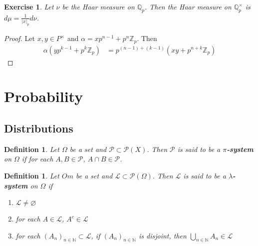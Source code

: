 \documentclass[12pt]{amsart}
\newtheorem{defn}[thm]{Definition}
\newtheorem{ex}[thm]{Exercise}
\newcommand{\al}{\alpha}
\newcommand{\lam}{\lambda}
\newcommand{\Om}{\Omega}
\newcommand{\N}{\mathbb{N}}
\newcommand{\Z}{\mathbb{Z}}
\newcommand{\Q}{\mathbb{Q}}
\newcommand{\ML}{\mathcal{L}}
\newcommand{\MP}{\mathcal{P}}
\begin{document}
	\begin{ex}
		Let $\nu$ be the Haar measure on $\Q_p$. Then the Haar measure on $\Q_p^{\times}$  is $d \mu = \frac{1}{|x|_p}d \nu$.
	\end{ex}

	\begin{proof}
		Let $x, y \in P^{\times}$ and $\al = xp^{n-1} + p^n\Z_p$. Then 
		\begin{align*}
			\al (yp^{k-1} + p^k \Z_p) 
			& = p^{(n-1)+ (k-1)}(xy + p^{n+k} \Z_p) 
		\end{align*}
	\end{proof}
	
	
	
	\newpage
	
	
	
	
	
	
	
	
	
	
	
	
	
	
	
	
	
	
	
	
	
	
	
	
	
	
	
	
	
	

	
	\section{Probability}
	\subsection{Distributions}
	
	\begin{defn}
		Let $\Om$ be a set and $\MP \subset \MP(X)$. Then $\MP$ is said to be a \textbf{$\pi$-system} on $\Om$ if for each $A,B \in \MP$, $A \cap B \in \MP$.
	\end{defn}
	
	\begin{defn}
		Let $Om$ be a set and $\ML \subset \MP(\Om)$. Then $\ML$ is said to be a \textbf{$\lam$-system} on $\Om$ if 
		\begin{enumerate}
			\item $\ML \neq \varnothing$
			\item for each $A \in \ML$, $A^c \in \ML$
			\item for each $(A_n)_{n \in \N} \subset \ML$, if $(A_n)_{n \in \N}$ is disjoint, then $\bigcup\limits_{n \in \N}A_n \in \ML$
		\end{enumerate}
	\end{defn}
	
\end{document}
